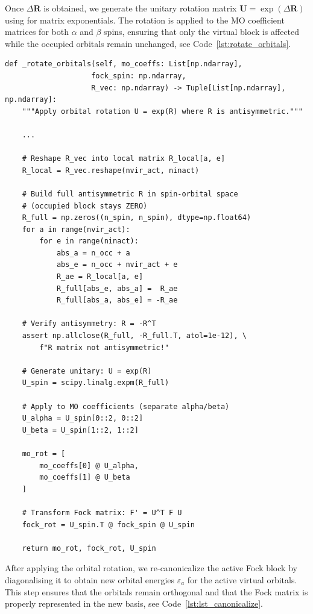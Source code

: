 Once $\Delta\mathbf{R}$ is obtained, we generate the unitary rotation matrix $\mathbf{U} = \exp(\Delta\mathbf{R})$ using  for matrix exponentials. The rotation is applied to the MO coefficient matrices for both $\alpha$ and $\beta$ spins, ensuring that only the virtual block is affected while the occupied orbitals remain unchanged, see Code~\ref{lst:rotate_orbitals}.

\begin{lstlisting}[style=python, caption={Orbital rotation via matrix exponential}, label=lst:rotate_orbitals]
def _rotate_orbitals(self, mo_coeffs: List[np.ndarray],
                    fock_spin: np.ndarray,
                    R_vec: np.ndarray) -> Tuple[List[np.ndarray], np.ndarray]:
    """Apply orbital rotation U = exp(R) where R is antisymmetric."""
    
    ...
    
    # Reshape R_vec into local matrix R_local[a, e]
    R_local = R_vec.reshape(nvir_act, ninact)
    
    # Build full antisymmetric R in spin-orbital space
    # (occupied block stays ZERO)
    R_full = np.zeros((n_spin, n_spin), dtype=np.float64)
    for a in range(nvir_act):
        for e in range(ninact):
            abs_a = n_occ + a
            abs_e = n_occ + nvir_act + e
            R_ae = R_local[a, e]
            R_full[abs_e, abs_a] =  R_ae
            R_full[abs_a, abs_e] = -R_ae
    
    # Verify antisymmetry: R = -R^T
    assert np.allclose(R_full, -R_full.T, atol=1e-12), \
        f"R matrix not antisymmetric!"
    
    # Generate unitary: U = exp(R)
    U_spin = scipy.linalg.expm(R_full)
    
    # Apply to MO coefficients (separate alpha/beta)
    U_alpha = U_spin[0::2, 0::2]
    U_beta = U_spin[1::2, 1::2]
    
    mo_rot = [
        mo_coeffs[0] @ U_alpha,
        mo_coeffs[1] @ U_beta
    ]
    
    # Transform Fock matrix: F' = U^T F U
    fock_rot = U_spin.T @ fock_spin @ U_spin
    
    return mo_rot, fock_rot, U_spin
\end{lstlisting}

After applying the orbital rotation, we re-canonicalize the active Fock block by diagonalising it to obtain new orbital energies $\varepsilon_a$ for the active virtual orbitals. This step ensures that the orbitals remain orthogonal and that the Fock matrix is properly represented in the new basis, see Code~\ref{lst:lst_canonicalize}.

